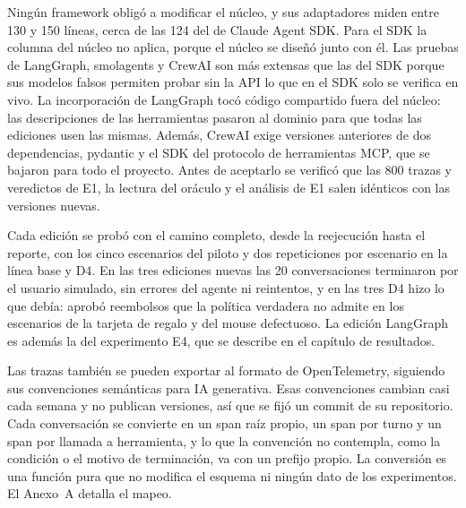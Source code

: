 Ningún framework obligó a modificar el núcleo, y sus adaptadores miden entre 130 y 150 líneas, cerca de las 124 del de Claude Agent SDK. Para el SDK la columna del núcleo no aplica, porque el núcleo se diseñó junto con él. Las pruebas de LangGraph, smolagents y CrewAI son más extensas que las del SDK porque sus modelos falsos permiten probar sin la API lo que en el SDK solo se verifica en vivo. La incorporación de LangGraph tocó código compartido fuera del núcleo: las descripciones de las herramientas pasaron al dominio para que todas las ediciones usen las mismas. Además, CrewAI exige versiones anteriores de dos dependencias, pydantic y el SDK del protocolo de herramientas MCP, que se bajaron para todo el proyecto. Antes de aceptarlo se verificó que las 800 trazas y veredictos de E1, la lectura del oráculo y el análisis de E1 salen idénticos con las versiones nuevas.
\par
{} Cada edición se probó con el camino completo, desde la reejecución hasta el reporte, con los cinco escenarios del piloto y dos repeticiones por escenario en la línea base y D4. En las tres ediciones nuevas las 20 conversaciones terminaron por el usuario simulado, sin errores del agente ni reintentos, y en las tres D4 hizo lo que debía: aprobó reembolsos que la política verdadera no admite en los escenarios de la tarjeta de regalo y del mouse defectuoso.
La edición LangGraph es además la del experimento E4, que se describe en el capítulo de resultados.
\par
{} Las trazas también se pueden exportar al formato de OpenTelemetry, siguiendo sus convenciones semánticas para IA generativa. Esas convenciones cambian casi cada semana y no publican versiones, así que se fijó un commit de su repositorio. Cada conversación se convierte en un span raíz propio, un span por turno y un span por llamada a herramienta, y lo que la convención no contempla, como la condición o el motivo de terminación, va con un prefijo propio. La conversión es una función pura que no modifica el esquema ni ningún dato de los experimentos. El Anexo~A detalla el mapeo.
\par
\endgroup
